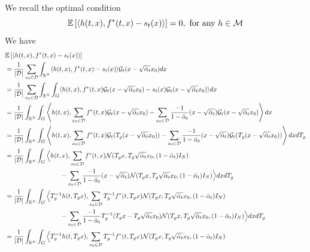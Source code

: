 \documentclass[a4paper,10pt]{article}
\begin{document}
We recall the optimal condition 
\begin{equation*}
\mathbb{E} \left[ {\langle h(t,x),f^*(t,x) -s_t(x)\rangle} \right] = 0, \text{ for any } h \in \mathcal{M}
\end{equation*}
We have
\begin{align*}
    & \E{\langle h(t,x),f^*(t,x) -s_t(x)\rangle} \\
    &= \frac{1}{|\mathcal{D}|}\sum_{x_0  \in \mathcal{D}} \int_{\R^N} \langle h(t,x),f^*(t,x)-s_t(x) \rangle \mathcal{G}_t(x -\sqrt{\bar \alpha_t}x_0)dx\\
    &= \frac{1}{|\mathcal{D}|}\sum_{x_0  \in \mathcal{D}} \int_{\R^N} \int_{G }\langle h(t,x),f^*(t,x) \mathcal{G}_t(x -\sqrt{\bar \alpha_t}x_0)-s_t(x) \mathcal{G}_t(x -\sqrt{\bar \alpha_t}x_0) \rangle dx\\
    &= \frac{1}{|\mathcal{D}|} \int_{\R^N} \int_G \left\langle h(t,x),\sum_{x_0  \in \mathcal{D}}f^*(t,x) \mathcal{G}_t(x -\sqrt{\bar \alpha_t}x_0)-\sum_{x_0  \in \mathcal{D}} \frac{-1}{1-\bar \alpha_t} (x -\sqrt{\bar \alpha_t})\mathcal{G}_t(x -\sqrt{\bar \alpha_t}x_0)  \right\rangle dx\\
    &= \frac{1}{|\mathcal{D}|} \int_{\R^N} \int_G  \left\langle h(t,x),\sum_{x_0  \in \mathcal{D}}f^*(t,x) \mathcal{G}_t(T_g(x -\sqrt{\bar \alpha_t}x_0))-\sum_{x_0  \in \mathcal{D}} \frac{-1}{1-\bar \alpha_t} (x -\sqrt{\bar \alpha_t})\mathcal{G}_t(T_g(x -\sqrt{\bar \alpha_t}x_0))  \right\rangle dx dT_g\\
    &= \frac{1}{|\mathcal{D}|} \int_{\R^N} \int_G\Big\langle h(t,x),\sum_{x_0  \in \mathcal{D}}f^*(t,x) \mathcal{N}(T_gx,T_g \sqrt{\bar \alpha_t}x_0,(1-\bar\alpha_t)I_N) \\
    & \hspace{3cm}  - \sum_{x_0  \in \mathcal{D}} \frac{-1}{1-\bar \alpha_t} (x -\sqrt{\bar \alpha_t})\mathcal{N}(T_gx,T_g \sqrt{\bar \alpha_t}x_0,(1-\bar\alpha_t)I_N)  \Big\rangle dx dT_g\\
    &= \frac{1}{|\mathcal{D}|} \int_{\R^N} \int_G \Big\langle T_g^{-1}h(t,T_gx),\sum_{x_0  \in \mathcal{D}}T_g^{-1}f^*(t,T_gx) \mathcal{N}(T_gx,T_g \sqrt{\bar \alpha_t}x_0,(1-\bar\alpha_t)I_N)\\
    & \hspace{3cm} -\sum_{x_0  \in \mathcal{D}} \frac{-1}{1-\bar \alpha_t} T_g^{-1}(T_gx -T_g \sqrt{\bar \alpha_t}x_0)\mathcal{N}(T_gx,T_g \sqrt{\bar \alpha_t}x_0,(1-\bar\alpha_t)I_N)  \Big\rangle dx dT_g\\
    &= \frac{1}{|\mathcal{D}|} \int_{\R^N} \int_G \Big\langle T_g^{-1}h(t,T_gx),\sum_{x_0  \in \mathcal{D}}T_g^{-1}f^*(t,T_gx) \mathcal{N}(T_gx,T_g \sqrt{\bar \alpha_t}x_0,(1-\bar\alpha_t)I_N)\\

\end{align*}
\end{document}
